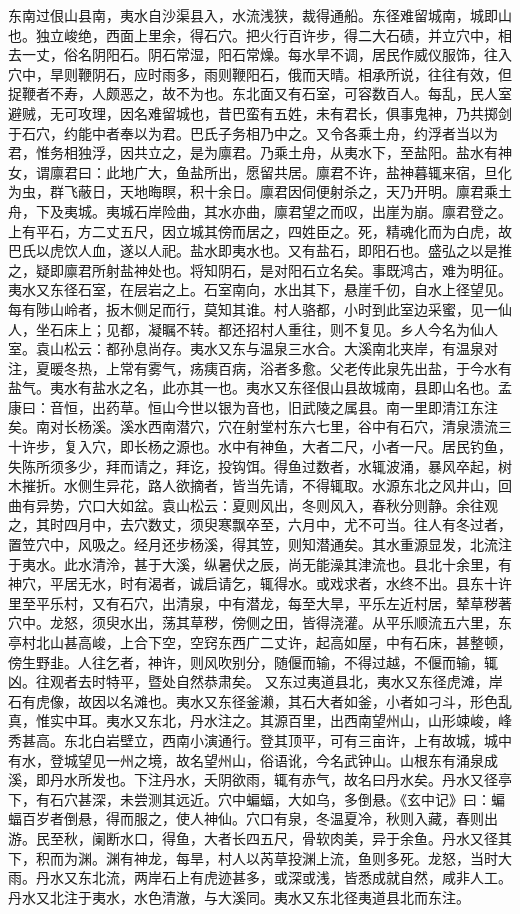 \documentclass[12pt,UTF8]{ctexbook}
\begin{document}
东南过佷山县南，夷水自沙渠县入，水流浅狭，裁得通船。东径难留城南，城即山也。独立峻绝，西面上里余，得石穴。把火行百许步，得二大石碛，并立穴中，相去一丈，俗名阴阳石。阴石常湿，阳石常燥。每水旱不调，居民作威仪服饰，往入穴中，旱则鞭阴石，应时雨多，雨则鞭阳石，俄而天晴。相承所说，往往有效，但捉鞭者不寿，人颇恶之，故不为也。东北面又有石室，可容数百人。每乱，民人室避贼，无可攻理，因名难留城也，昔巴蛮有五姓，未有君长，俱事鬼神，乃共掷剑于石穴，约能中者奉以为君。巴氏子务相乃中之。又令各乘土舟，约浮者当以为君，惟务相独浮，因共立之，是为廪君。乃乘土舟，从夷水下，至盐阳。盐水有神女，谓廪君曰：此地广大，鱼盐所出，愿留共居。廪君不许，盐神暮辄来宿，旦化为虫，群飞蔽日，天地晦瞑，积十余日。廪君因伺便射杀之，天乃开明。廪君乘土舟，下及夷城。夷城石岸险曲，其水亦曲，廪君望之而叹，出崖为崩。廪君登之。上有平石，方二丈五尺，因立城其傍而居之，四姓臣之。死，精魂化而为白虎，故巴氏以虎饮人血，遂以人祀。盐水即夷水也。又有盐石，即阳石也。盛弘之以是推之，疑即廪君所射盐神处也。将知阴石，是对阳石立名矣。事既鸿古，难为明征。夷水又东径石室，在层岩之上。石室南向，水出其下，悬崖千仞，自水上径望见。每有陟山岭者，扳木侧足而行，莫知其谁。村人骆都，小时到此室边采蜜，见一仙人，坐石床上；见都，凝瞩不转。都还招村人重往，则不复见。乡人今名为仙人室。袁山松云：都孙息尚存。夷水又东与温泉三水合。大溪南北夹岸，有温泉对注，夏暖冬热，上常有雾气，疡痍百病，浴者多愈。父老传此泉先出盐，于今水有盐气。夷水有盐水之名，此亦其一也。夷水又东径佷山县故城南，县即山名也。孟康曰：音恒，出药草。恒山今世以银为音也，旧武陵之属县。南一里即清江东注矣。南对长杨溪。溪水西南潜穴，穴在射堂村东六七里，谷中有石穴，清泉溃流三十许步，复入穴，即长杨之源也。水中有神鱼，大者二尺，小者一尺。居民钓鱼，失陈所须多少，拜而请之，拜讫，投钩饵。得鱼过数者，水辄波涌，暴风卒起，树木摧折。水侧生异花，路人欲摘者，皆当先请，不得辄取。水源东北之风井山，回曲有异势，穴口大如盆。袁山松云：夏则风出，冬则风入，春秋分则静。余往观之，其时四月中，去穴数丈，须臾寒飘卒至，六月中，尤不可当。往人有冬过者，置笠穴中，风吸之。经月还步杨溪，得其笠，则知潜通矣。其水重源显发，北流注于夷水。此水清泠，甚于大溪，纵暑伏之辰，尚无能澡其津流也。县北十余里，有神穴，平居无水，时有渴者，诚启请乞，辄得水。或戏求者，水终不出。县东十许里至平乐村，又有石穴，出清泉，中有潜龙，每至大旱，平乐左近村居，辇草秽著穴中。龙怒，须臾水出，荡其草秽，傍侧之田，皆得浇灌。从平乐顺流五六里，东亭村北山甚高峻，上合下空，空窍东西广二丈许，起高如屋，中有石床，甚整顿，傍生野韭。人往乞者，神许，则风吹别分，随偃而输，不得过越，不偃而输，辄凶。往观者去时特平，暨处自然恭肃矣。
又东过夷道县北，夷水又东径虎滩，岸石有虎像，故因以名滩也。夷水又东径釜濑，其石大者如釜，小者如刁斗，形色乱真，惟实中耳。夷水又东北，丹水注之。其源百里，出西南望州山，山形竦峻，峰秀甚高。东北白岩壁立，西南小演通行。登其顶平，可有三亩许，上有故城，城中有水，登城望见一州之境，故名望州山，俗语讹，今名武钟山。山根东有涌泉成溪，即丹水所发也。下注丹水，夭阴欲雨，辄有赤气，故名曰丹水矣。丹水又径亭下，有石穴甚深，未尝测其远近。穴中蝙蝠，大如乌，多倒悬。《玄中记》曰：蝙蝠百岁者倒悬，得而服之，使人神仙。穴口有泉，冬温夏冷，秋则入藏，春则出游。民至秋，阑断水口，得鱼，大者长四五尺，骨软肉美，异于余鱼。丹水又径其下，积而为渊。渊有神龙，每旱，村人以芮草投渊上流，鱼则多死。龙怒，当时大雨。丹水又东北流，两岸石上有虎迹甚多，或深或浅，皆悉成就自然，咸非人工。丹水又北注于夷水，水色清澈，与大溪同。夷水又东北径夷道县北而东注。
\end{document}
